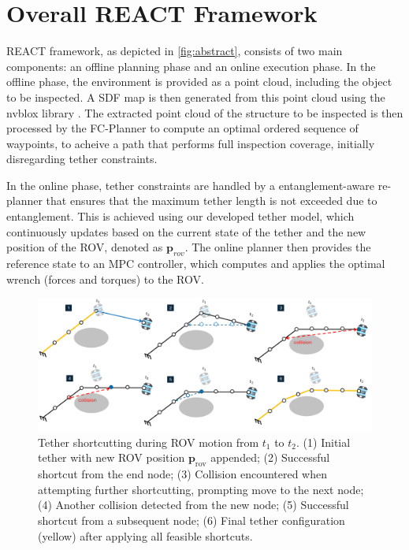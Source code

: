 

\section{Overall \ac{REACT}  Framework}
\label{sec:framework}
\ac{REACT} framework, as depicted in \ref{fig:abstract}, consists of two main components: an offline planning phase and an online execution phase. In the offline phase, the environment is provided as a point cloud, including the object to be inspected. A \ac{SDF} map is then generated from this point cloud using the nvblox library \cite{nvblox}. The extracted point cloud of the structure to be inspected is then processed by the FC-Planner \cite{feng2024fc} to compute an optimal ordered sequence of waypoints, to acheive a path that performs full inspection coverage, initially disregarding tether constraints.

In the online phase, tether constraints are handled by a entanglement-aware re-planner that ensures that the maximum tether length is not exceeded due to entanglement. This is achieved using our developed tether model, which continuously updates based on the current state of the tether and the new position of the \ac{ROV}, denoted as $\textbf{p}_{rov}$. The online planner then provides the reference state to an \ac{MPC} controller, which computes and applies the optimal wrench (forces and torques) to the \ac{ROV}.




\begin{figure}[t!]
    \centering
    \includegraphics[width=1\linewidth]{Phd_thesis/figures/tether_model.pdf}
    \caption{Tether shortcutting during \ac{ROV} motion from \( t_1 \) to \( t_2 \). (1) Initial tether with new \ac{ROV} position \( \mathbf{p}_{\text{rov}} \) appended; (2) Successful shortcut from the end node; (3) Collision encountered when attempting further shortcutting, prompting move to the next node; (4) Another collision detected from the new node; (5) Successful shortcut from a subsequent node; (6) Final tether configuration (yellow) after applying all feasible shortcuts.}
    \label{fig:tether}
\end{figure}



